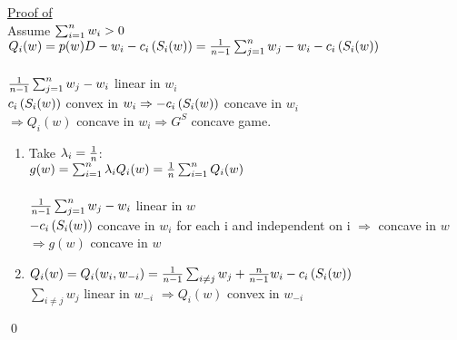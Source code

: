 \documentclass[11pt]{article}
\theoremstyle{definition}
\theoremstyle{definition}
\begin{document}
\underline{Proof of }\\
Assume $\sum_{i=1}^n w_i > 0$\\

$Q_i (w) = p(w) D - w_i - c_i \left( S_i(w) \right) = \frac{1}{n-1}\sum_{j=1}^n w_j - w_i - c_i \left( S_i(w) \right)$\\\\
$\frac{1}{n-1} \sum_{j=1}^n w_j - w_i$ linear in $w_i$\\
$c_i \left( S_i(w) \right)$ convex in $w_i \Rightarrow -c_i \left( S_i(w) \right)$ concave in $w_i$\\
$\Rightarrow Q_i(w)$ concave in $w_i \Rightarrow G^S$ concave game.

\begin{enumerate}
	\item
		Take $\lambda_i = \frac{1}{n}$:\\
		$g(w) = \sum_{i=1}^n \lambda_i Q_i(w) = \frac{1}{n} \sum_{i=1}^n Q_i(w)$\\\\
		$\frac{1}{n-1} \sum_{j=1}^n w_j - w_i$ linear in $w$\\
		$-c_i \left( S_i(w) \right)$ concave in $w_i$ for each i and independent on i $\Rightarrow$ concave in $w$\\
		$\Rightarrow g(w)$ concave in $w$
	\item
		$Q_i(w) = Q_i(w_i,w_{-i}) = \frac{1}{n-1} \sum_{i\neq j} w_j + \frac{n}{n-1} w_i - c_i \left( S_i(w) \right)$\\
		$\sum_{i\neq j} w_j$ linear in $w_{-i}$
		$\Rightarrow Q_i(w)$ convex in $w_{-i}$
\end{enumerate}
\qed



\end{document}
